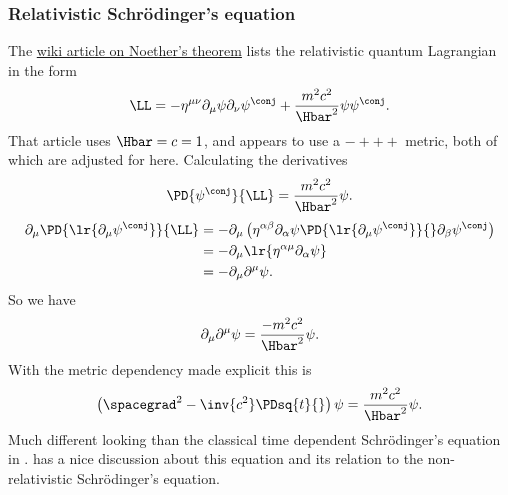 \subsubsection{Relativistic Schr\"{o}dinger's equation}
%
The
\href{https://en.wikipedia.org/wiki/Noether%27s_theorem}{wiki article on Noether's theorem} lists the relativistic quantum Lagrangian in the form
%
\begin{equation}\label{eqn:fieldLagrangian:640}
\LL = -\eta^{\mu\nu}\partial_\mu \psi \partial_\nu \psi^\conj + \frac{m^2 c^2}{\Hbar^2}\psi \psi^\conj.
\end{equation}
%
That article uses \(\Hbar = c = 1\), and appears to use a \(-+++\) metric, both
of which are adjusted for here.
%
Calculating the derivatives
%
\begin{equation}\label{eqn:fieldLagrangian:660}
\PD{\psi^\conj}{\LL} = \frac{m^2 c^2}{\Hbar^2} \psi.
\end{equation}
%
\begin{equation}\label{eqn:fieldLagrangian:680}
\begin{aligned}
\partial_\mu \PD{
\lr{ \partial_\mu \psi^\conj }
}{\LL}
&= -\partial_\mu \left(\eta^{\alpha\beta}\partial_\alpha \psi \PD{
\lr{ \partial_\mu \psi^\conj }
}{} \partial_\beta \psi^\conj\right) \\
&= -\partial_\mu
\lr{ \eta^{\alpha\mu}\partial_\alpha \psi } \\
&= -\partial_\mu \partial^\mu \psi .
\end{aligned}
\end{equation}
%
So we have
\begin{equation}\label{eqn:fieldLagrangian:700}
\partial_\mu \partial^\mu \psi = \frac{-m^2 c^2}{\Hbar^2} \psi.
\end{equation}
%
%
%
%
%
With the metric dependency made explicit this is
\begin{equation}\label{eqn:fieldLagrangian:720}
\left(\spacegrad^2 - \inv{c^2}\PDsq{t}{}\right) \psi = \frac{m^2 c^2}{\Hbar^2} \psi.
\end{equation}
%
Much different looking than the classical time dependent Schr\"{o}dinger's equation in .
\citep{srednicki2007qft} has a nice discussion about this equation and its relation to the non-relativistic Schr\"{o}dinger's equation.
